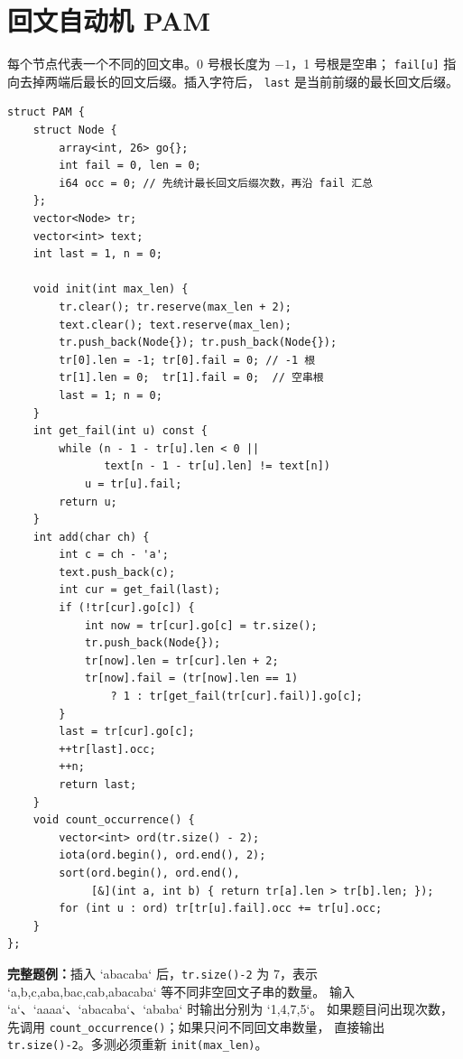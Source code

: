 \section{回文自动机 PAM}


每个节点代表一个不同的回文串。0 号根长度为 \(-1\)，1 号根是空串；
\texttt{fail[u]} 指向去掉两端后最长的回文后缀。插入字符后，
\texttt{last} 是当前前缀的最长回文后缀。

\begin{lstlisting}[style=cpp]
struct PAM {
    struct Node {
        array<int, 26> go{};
        int fail = 0, len = 0;
        i64 occ = 0; // 先统计最长回文后缀次数，再沿 fail 汇总
    };
    vector<Node> tr;
    vector<int> text;
    int last = 1, n = 0;

    void init(int max_len) {
        tr.clear(); tr.reserve(max_len + 2);
        text.clear(); text.reserve(max_len);
        tr.push_back(Node{}); tr.push_back(Node{});
        tr[0].len = -1; tr[0].fail = 0; // -1 根
        tr[1].len = 0;  tr[1].fail = 0;  // 空串根
        last = 1; n = 0;
    }
    int get_fail(int u) const {
        while (n - 1 - tr[u].len < 0 ||
               text[n - 1 - tr[u].len] != text[n])
            u = tr[u].fail;
        return u;
    }
    int add(char ch) {
        int c = ch - 'a';
        text.push_back(c);
        int cur = get_fail(last);
        if (!tr[cur].go[c]) {
            int now = tr[cur].go[c] = tr.size();
            tr.push_back(Node{});
            tr[now].len = tr[cur].len + 2;
            tr[now].fail = (tr[now].len == 1)
                ? 1 : tr[get_fail(tr[cur].fail)].go[c];
        }
        last = tr[cur].go[c];
        ++tr[last].occ;
        ++n;
        return last;
    }
    void count_occurrence() {
        vector<int> ord(tr.size() - 2);
        iota(ord.begin(), ord.end(), 2);
        sort(ord.begin(), ord.end(),
             [&](int a, int b) { return tr[a].len > tr[b].len; });
        for (int u : ord) tr[tr[u].fail].occ += tr[u].occ;
    }
};
\end{lstlisting}

\begin{card}
\textbf{完整题例：}插入 `abacaba` 后，\texttt{tr.size()-2} 为 7，表示
`a,b,c,aba,bac,cab,abacaba` 等不同非空回文子串的数量。
输入 `a`、`aaaa`、`abacaba`、`ababa` 时输出分别为 `1,4,7,5`。
如果题目问出现次数，先调用 \texttt{count\_occurrence()}；如果只问不同回文串数量，
直接输出 \texttt{tr.size()-2}。多测必须重新 \texttt{init(max\_len)}。
\end{card}

